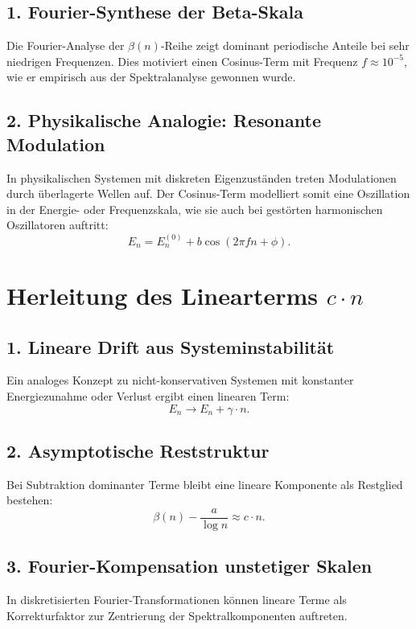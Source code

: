 \documentclass[a4paper,12pt]{article}
\begin{document}
\subsection*{1. Fourier-Synthese der Beta-Skala}

Die Fourier-Analyse der \(\beta(n)\)-Reihe zeigt dominant periodische Anteile bei sehr niedrigen Frequenzen. Dies motiviert einen Cosinus-Term mit Frequenz \(f \approx 10^{-5}\), wie er empirisch aus der Spektralanalyse gewonnen wurde.

\subsection*{2. Physikalische Analogie: Resonante Modulation}

In physikalischen Systemen mit diskreten Eigenzuständen treten Modulationen durch überlagerte Wellen auf. Der Cosinus-Term modelliert somit eine Oszillation in der Energie- oder Frequenzskala, wie sie auch bei gestörten harmonischen Oszillatoren auftritt:
\[
E_n = E_n^{(0)} + b \cos(2\pi f n + \phi).
\]

\section{Herleitung des Linearterms \(c \cdot n\)}

\subsection*{1. Lineare Drift aus Systeminstabilität}

Ein analoges Konzept zu nicht-konservativen Systemen mit konstanter Energiezunahme oder Verlust ergibt einen linearen Term:
\[
E_n \rightarrow E_n + \gamma \cdot n.
\]

\subsection*{2. Asymptotische Reststruktur}

Bei Subtraktion dominanter Terme bleibt eine lineare Komponente als Restglied bestehen:
\[
\beta(n) - \frac{a}{\log n} \approx c \cdot n.
\]

\subsection*{3. Fourier-Kompensation unstetiger Skalen}

In diskretisierten Fourier-Transformationen können lineare Terme als Korrekturfaktor zur Zentrierung der Spektralkomponenten auftreten.
\end{document}
